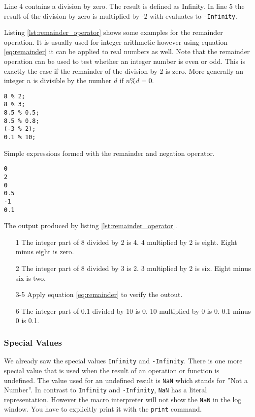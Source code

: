 Line 4 contains a division by zero. The result is defined as Infinity. In line 5 the result of the division by zero is multiplied by -2 with evaluates to {\tt -Infinity}.

Listing \ref{lst:remainder_operator} shows some examples for the remainder operation. It is usually used for integer arithmetic however using equation \ref{eq:remainder} it can be applied to real numbers as well. Note that the remainder operation can be used to test whether an integer number is even or odd. This is exactly the case if the remainder of the division by 2 is zero. More generally an integer $n$ is divisible by the number $d$ if $n\%d=0$.

\begin{listing}[H]
\begin{verbatim}
8 % 2;
8 % 3;
8.5 % 0.5;
8.5 % 0.8;
(-3 % 2);
0.1 % 10;
\end{verbatim}
\caption{Simple expressions formed with the remainder and negation operator.}
\label{lst:remainder_operator}
\end{listing}

\begin{listing}[H]
\begin{verbatim}
0
2
0
0.5
-1
0.1
\end{verbatim}
\caption{The output produced by listing \ref{lst:remainder_operator}.}
\label{lst:remainder_operator_results}
\end{listing}

\begin{enumerate}
\item[1] The integer part of 8 divided by 2 is 4. 4 multiplied by 2 is eight. Eight minus eight is zero.
\item[2] The integer part of 8 divided by 3 is 2. 3 multiplied by 2 is six. Eight minus six is two. 
\item[3-5] Apply equation \ref{eq:remainder} to verify the outout.
\item[6] The integer part of 0.1 divided by 10 is 0. 10 multiplied by 0 is 0. 0.1 minus 0 is 0.1.
\end{enumerate}

\subsubsection{Special Values}

We already saw the special values {\tt Infinity} and {\tt -Infinity}. There is one more special value that is used when the result of an operation or function is undefined. The value used for an undefined result is {\tt NaN} which stands for ''Not a Number''.
In contrast to {\tt Infinity} and {\tt -Infinity}, {\tt NaN} has a literal representation. However the macro interpreter will not show the {\tt NaN} in the log window. You have to explicitly print it with the {\tt print} command.

